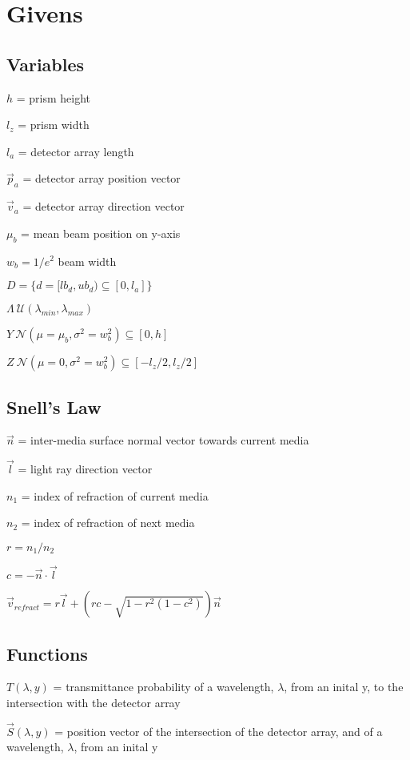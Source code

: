\documentclass{article}
\begin{document}
\section{Givens}\label{sec:givens}
\subsection{Variables}\label{subsec:variables}
$h$ = prism height

$l_z$  = prism width

$l_a$  = detector array length

$\vec{p}_a$ = detector array position vector

$\vec{v}_a$ = detector array direction vector

$\mu_b$ = mean beam position on y-axis

$w_b  =  1 / e^2$ {beam width}

$D  = \{ d = [lb_d, ub_d) \subseteq [0, l_a] \}$

$\Lambda  ~ \mathcal{U}(\lambda_{min}, \lambda_{max}) $

$Y ~ \mathcal {N}(\mu=\mu_b, \sigma^2=w^2_b) \subseteq [0, h] $

$Z ~ \mathcal {N}(\mu=0, \sigma^2=w^2_b) \subseteq [-l_z / 2, l_z / 2]$


\subsection{Snell's Law}\label{subsec:snell's-law}
$\vec{n}$ = inter-media surface normal vector towards current media

$\vec{l}$ = light ray direction vector

$n_1$ = index of refraction of current media

$n_2$ = index of refraction of next media

$r = n_1 / n_2$

$c = -\vec{n} \cdot{} \vec{l}$

$\vec{v}_{refract} = r \vec{l} + (r c - \sqrt{1 - r^2 (1 - c^2)}) \vec{n}$


\subsection{Functions}\label{subsec:functions}
$T(\lambda, y)$ = transmittance probability of a wavelength, $\lambda$, from an inital y, to the intersection with the detector array

$\vec{S}(\lambda, y)$  = position vector of the intersection of the detector array, and of a wavelength, $\lambda$, from an inital y
\end{document}
